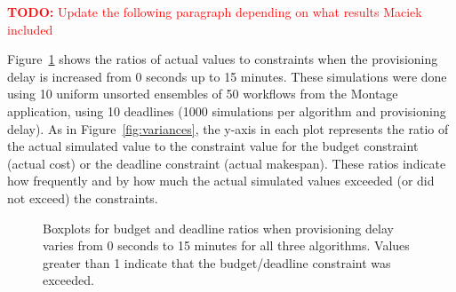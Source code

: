 \documentclass[conference]{IEEEtran}
\newcommand{\TODO}[1]{
  {\Large \textcolor{red}{\textbf{TODO: }#1}}
}
\begin{document}
\TODO{Update the following paragraph depending on what results Maciek included}

Figure~\ref{fig:delays} shows the ratios of actual values to constraints when
the provisioning delay is increased from 0 seconds up to 15 minutes. These
simulations were done using 10 uniform unsorted ensembles of 50 workflows from
the Montage application, using 10 deadlines (1000 simulations per algorithm
and provisioning delay). As in Figure~\ref{fig:variances}, the y-axis in each
plot represents the ratio of the actual simulated value to the constraint
value for the budget constraint (actual cost) or the deadline constraint
(actual makespan). These ratios indicate how frequently and by how much the
actual simulated values exceeded (or did not exceed) the constraints.

\begin{figure}[tb]
    \centering
    \hspace{2cm}
    \caption{Boxplots for budget and deadline ratios when provisioning delay 
    varies from 0 seconds to 15 minutes for all three algorithms. Values 
    greater than 1 indicate that the budget/deadline constraint was exceeded.}
    \label{fig:delays}
\end{figure}
\end{document}

